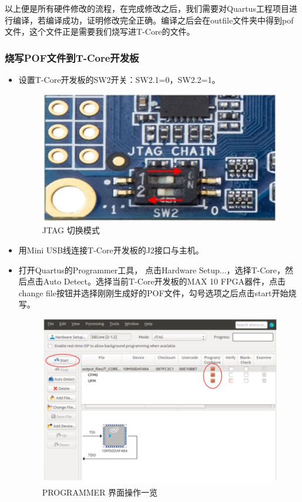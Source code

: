 \documentclass[a4paper, 14pt, oneside]{book} %
\numberwithin{equation}{subsection}
\begin{document}
	以上便是所有硬件修改的流程，在完成修改之后，我们需要对Quartus工程项目进行编译，若编译成功，证明修改完全正确。编译之后会在outfile文件夹中得到pof文件，这个文件正是需要我们烧写进T-Core的文件。
	
	\subsubsection{烧写POF文件到T-Core开发板}
	\begin{itemize}
		\item 设置T-Core开发板的SW2开关：SW2.1=0，SW2.2=1。
		\begin{figure}[H]
			\centering
			\includegraphics[scale=0.7]{img/jtag.jpg}
			\caption{JTAG 切换模式}
		\end{figure}
		\item 用Mini USB线连接T-Core开发板的J2接口与主机。
		\item 打开Quartus的Programmer工具， 点击Hardware Setup...，选择T-Core，然后点击Auto Detect。选择当前T-Core开发板的MAX 10 FPGA器件，点击change file按钮并选择刚刚生成好的POF文件，勾号选项之后点击start开始烧写。
		\begin{figure}[H]
			\centering
			\includegraphics[scale=0.7]{img/pof.jpg}
			\caption{PROGRAMMER 界面操作一览}
		\end{figure}
		
	\end{itemize}	
\end{document}
